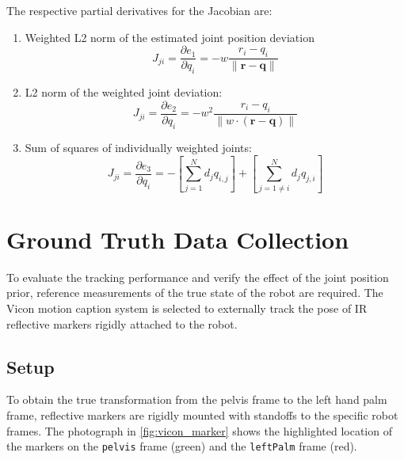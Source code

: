 The respective partial derivatives for the Jacobian are:
\begin{enumerate}
\item Weighted L2 norm of the estimated joint position deviation
\begin{equation}
J_{ji} = \frac{\partial e_1}{\partial q_i} = -w \frac{r_i - q_i}{\lVert \mathbf{r} - \mathbf{q} \rVert}
\end{equation}

\item L2 norm of the weighted joint deviation:
\begin{equation}
J_{ji} = \frac{\partial e_2}{\partial q_i} = -w^2 \frac{r_i - q_i}{\lVert w \cdot (\mathbf{r} - \mathbf{q}) \rVert}
\end{equation}

\item Sum of squares of individually weighted joints:
\begin{equation}
J_{ji} = \frac{\partial e_3}{\partial q_i} = - \left[ \sum_{j=1}^N d_jq_{i,j}\right] + \left[ \sum_{j=1 \neq i}^N d_jq_{j,i}\right]
\end{equation}
\end{enumerate}


\section{Ground Truth Data Collection}

To evaluate the tracking performance and verify the effect of the joint position prior, reference measurements of the true state of the robot are required. The Vicon motion caption system is selected to externally track the pose of IR reflective markers rigidly attached to the robot.

\subsection{Setup}

To obtain the true transformation from the pelvis frame to the left hand palm frame, reflective markers are rigidly mounted with standoffs to the specific robot frames. The photograph in \cref{fig:vicon_marker} shows the highlighted location of the markers on the \texttt{pelvis} frame (green) and the \texttt{leftPalm} frame (red).

